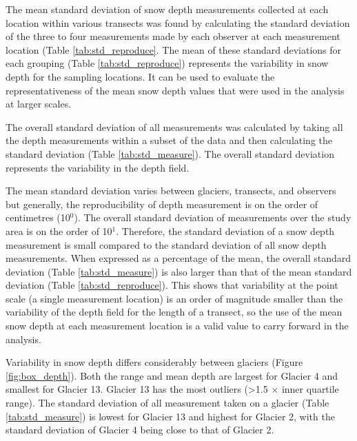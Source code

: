 \documentclass{sfuthesis}
\begin{document}
\begin{appendices}
The mean standard deviation of snow depth measurements collected at each location within various transects was found by calculating the standard deviation of the three to four measurements made by each observer at each measurement location (Table \ref{tab:std_reproduce}. The mean of these standard deviations for each grouping (Table \ref{tab:std_reproduce}) represents the variability in snow depth for the sampling locations. It can be used to evaluate the representativeness of the mean snow depth values that were used in the analysis at larger scales.

The overall standard deviation of all measurements was calculated by taking all the depth measurements within a subset of the data and then calculating the standard deviation (Table \ref{tab:std_measure}). The overall standard deviation represents the variability in the depth field. 

The mean standard deviation varies between glaciers, transects, and observers but  generally, the reproducibility of depth measurement is on the order of centimetres (10$^0$). The overall standard deviation of measurements over the study area is on the order of 10$^1$. Therefore, the standard deviation of a snow depth measurement is small compared to the standard deviation of all snow depth measurements. When expressed as a percentage of the mean, the overall standard deviation (Table \ref{tab:std_measure}) is also larger than that of the mean standard deviation (Table \ref{tab:std_reproduce}). This shows that variability at the point scale (a single measurement location) is an order of magnitude smaller than the variability of the depth field for the length of a transect, so the use of the mean snow depth at each measurement location is a valid value to carry forward in the analysis. 

Variability in snow depth differs considerably between glaciers (Figure \ref{fig:box_depth}). Both the range and mean depth are largest for Glacier 4 and smallest for Glacier 13. Glacier 13 has the most outliers (\textgreater 1.5 $\times$ inner quartile range). The standard deviation of all measurement taken on a glacier (Table \ref{tab:std_measure}) is lowest for Glacier 13 and highest for Glacier 2, with the standard deviation of Glacier 4 being close to that of Glacier 2. 



\end{appendices}
\end{document}

